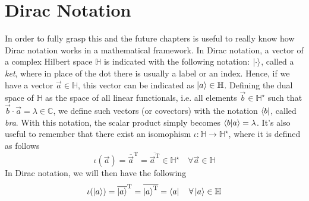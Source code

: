 \documentclass[../qm.tex]{subfiles}
\begin{document}
\section{Dirac Notation}
	In order to fully grasp this and the future chapters is useful to really know how Dirac notation works in a mathematical framework. In Dirac notation, a vector of a complex Hilbert space $\mathbb{H}$ is indicated with the following notation: $\ket{\cdot}$, called a \textit{ket}, where in place of the dot there is usually a label or an index. Hence, if we have a vector $\vec{a}\in\mathbb{H}$, this vector can be indicated as $\ket{a}\in\mathbb{H}$. Defining the dual space of $\mathbb{H}$ as the space of all linear functionals, i.e. all elements $\vec{b}\in\mathbb{H^{\star}}$ such that $\vec{b}\cdot\vec{a}=\lambda\in\mathbb{C}$, we define such vectors (or covectors) with the notation $\bra{b}$, called \textit{bra}. With this notation, the scalar product simply becomes $\bra{b}\ket{a}=\lambda$. It's also useful to remember that there exist an isomophism $\iota:\mathbb{H}\to\mathbb{H^{\star}}$, where it is defined as follows
	\begin{equation*}
		\iota(\vec{a})=\overline{\vec{a}}^{\text{T}}=\overline{\vec{a}^{\text{T}}}\in\mathbb{H^{\star}}\quad\forall\vec{a}\in\mathbb{H}
	\end{equation*}
	In Dirac notation, we will then have the following
	\begin{equation*}
		\iota(\ket{a})=\overline{\ket{a}}^{\text{T}}=\overline{\ket{a}^{\text{T}}}=\bra{a}\quad\forall\ket{a}\in\mathbb{H}
	\end{equation*}
\end{document}
